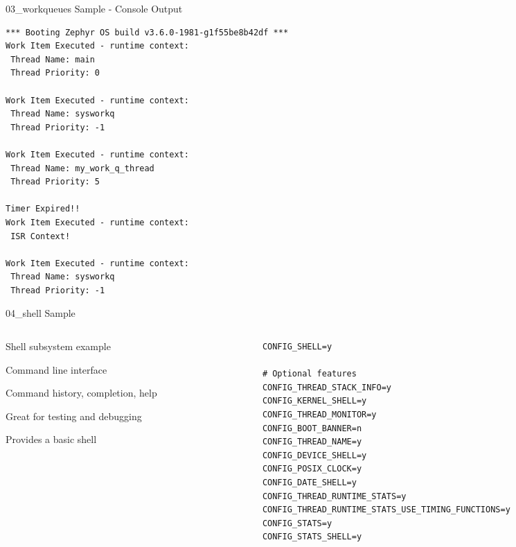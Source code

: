\documentclass[10pt, aspectratio=169]{beamer}
\begin{document}
\begin{frame}[fragile]{03\_workqueues Sample - Console Output}
  \begin{listing}[H]
    \begin{verbatim}
*** Booting Zephyr OS build v3.6.0-1981-g1f55be8b42df ***
Work Item Executed - runtime context:
 Thread Name: main 
 Thread Priority: 0 

Work Item Executed - runtime context:
 Thread Name: sysworkq 
 Thread Priority: -1 

Work Item Executed - runtime context:
 Thread Name: my_work_q_thread 
 Thread Priority: 5 

Timer Expired!!
Work Item Executed - runtime context:
 ISR Context!

Work Item Executed - runtime context:
 Thread Name: sysworkq 
 Thread Priority: -1
    \end{verbatim}
  \end{listing}
\end{frame}
\begin{frame}[fragile]{04\_shell Sample}
  \begin{columns}
    \begin{column}{0.6\textwidth}
      \begin{description}
	\item [Description] Shell subsystem example\footnotemark
	\item [Shell] Command line interface
	\item Command history, completion, help
	\item Great for testing and debugging
	\item [Sample] Provides a basic shell
      \end{description}
    \end{column}
    \begin{column}{0.4\textwidth}
        {\fontsize{6}{6}\selectfont
  \begin{listing}[H]
    \begin{verbatim}
CONFIG_SHELL=y

# Optional features
CONFIG_THREAD_STACK_INFO=y
CONFIG_KERNEL_SHELL=y
CONFIG_THREAD_MONITOR=y
CONFIG_BOOT_BANNER=n
CONFIG_THREAD_NAME=y
CONFIG_DEVICE_SHELL=y
CONFIG_POSIX_CLOCK=y
CONFIG_DATE_SHELL=y
CONFIG_THREAD_RUNTIME_STATS=y
CONFIG_THREAD_RUNTIME_STATS_USE_TIMING_FUNCTIONS=y
CONFIG_STATS=y
CONFIG_STATS_SHELL=y
    \end{verbatim}
    \caption{\scriptsize{Excerpt from samples/04\_shell/prj.conf}}
  \end{listing}
        }
    \end{column}
  \end{columns}
\end{frame}
\end{document}
